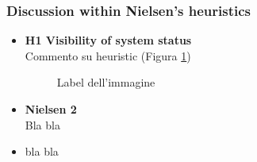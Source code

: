\subsubsection{Discussion within Nielsen's heuristics}
\begin{itemize}
    \item \textbf{H1 Visibility of system status}\\
    Commento su heuristic (Figura \ref{fig:1-image-ref})
    \begin{figure}[!ht]
        \begin{minipage}{\linewidth}
            \centering
            \captionsetup{justification=centering}
            \caption{Label dell'immagine}
            \label{fig:1-image-ref}
        \end{minipage}
    \end{figure}
    \item \textbf{Nielsen 2}\\
    Bla bla
    \item bla bla
\end{itemize}
\pagebreak
